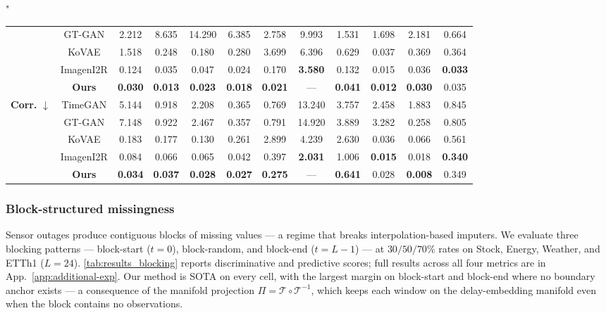 "\documentclass{article}
\theoremstyle{plain}
\theoremstyle{definition}
\theoremstyle{remark}
\newcommand{\tsimg}{\mathcal{T}}
\newcommand{\imgts}{\mathcal{T}^{-1}}
\begin{document}
\begin{table}[t]
{\begin{tabular}{cc|cccccccccc}
  & GT-GAN      & 2.212 & 8.635 & 14.290 & 6.385 & 2.758 & 9.993 & 1.531 & 1.698 & 2.181 & 0.664 \\
  & KoVAE       & 1.518 & 0.248 & 0.180 & 0.280 & 3.699 & 6.396 & 0.629 & 0.037 & 0.369 & 0.364 \\
  & ImagenI2R   & 0.124 & 0.035 & 0.047 & 0.024 & 0.170 & \textbf{3.580} & 0.132 & 0.015 & 0.036 & \textbf{0.033} \\
  & \textbf{Ours} & \textbf{0.030} & \textbf{0.013} & \textbf{0.023} & \textbf{0.018} & \textbf{0.021} & --- & \textbf{0.041} & \textbf{0.012} & \textbf{0.030} & 0.035 \\
\midrule
\multirow{5}{*}{\textbf{Corr.} $\downarrow$}
  & TimeGAN     & 5.144 & 0.918 & 2.208 & 0.365 & 0.769 & 13.240 & 3.757 & 2.458 & 1.883 & 0.845 \\
  & GT-GAN      & 7.148 & 0.922 & 2.467 & 0.357 & 0.791 & 14.920 & 3.889 & 3.282 & 0.258 & 0.805 \\
  & KoVAE       & 0.183 & 0.177 & 0.130 & 0.261 & 2.899 & 4.239 & 2.630 & 0.036 & 0.066 & 0.561 \\
  & ImagenI2R   & 0.084 & 0.066 & 0.065 & 0.042 & 0.397 & \textbf{2.031} & 1.006 & \textbf{0.015} & 0.018 & \textbf{0.340} \\
  & \textbf{Ours} & \textbf{0.034} & \textbf{0.037} & \textbf{0.028} & \textbf{0.027} & \textbf{0.275} & --- & \textbf{0.641} & 0.028 & \textbf{0.008} & 0.349 \\
\bottomrule
\end{tabular}
}
\end{table}

\subsubsection{Block-structured missingness}
\label{sec:quant-block}

Sensor outages produce contiguous blocks of missing values --- a regime that breaks interpolation-based imputers. We evaluate three blocking patterns --- block-start ($t{=}0$), block-random, and block-end ($t{=}L{-}1$) --- at $30/50/70\%$ rates on Stock, Energy, Weather, and ETTh1 ($L{=}24$). \cref{tab:results_blocking} reports discriminative and predictive scores; full results across all four metrics are in App.~\ref{app:additional-exp}. Our method is SOTA on every cell, with the largest margin on block-start and block-end where no boundary anchor exists --- a consequence of the manifold projection $\Pi = \tsimg \circ \imgts$, which keeps each window on the delay-embedding manifold even when the block contains no observations.
\end{document}
